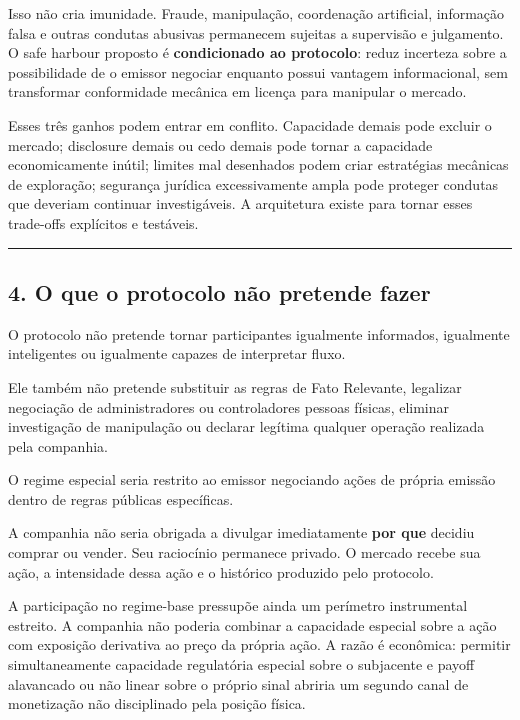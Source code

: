 \documentclass[
  a4paper,
]{article}
\begin{document}
Isso não cria imunidade. Fraude, manipulação, coordenação artificial,
informação falsa e outras condutas abusivas permanecem sujeitas a
supervisão e julgamento. O safe harbour proposto é \textbf{condicionado
ao protocolo}: reduz incerteza sobre a possibilidade de o emissor
negociar enquanto possui vantagem informacional, sem transformar
conformidade mecânica em licença para manipular o mercado.

Esses três ganhos podem entrar em conflito. Capacidade demais pode
excluir o mercado; disclosure demais ou cedo demais pode tornar a
capacidade economicamente inútil; limites mal desenhados podem criar
estratégias mecânicas de exploração; segurança jurídica excessivamente
ampla pode proteger condutas que deveriam continuar investigáveis. A
arquitetura existe para tornar esses trade-offs explícitos e testáveis.

\begin{center}\rule{0.5\linewidth}{0.5pt}\end{center}

\hypertarget{4-o-que-o-protocolo-nao-pretende-fazer}{}

\hypertarget{4-o-que-o-protocolo-nuxe3o-pretende-fazer}{%
\subsection{4. O que o protocolo não pretende
fazer}\label{4-o-que-o-protocolo-nuxe3o-pretende-fazer}}

O protocolo não pretende tornar participantes igualmente informados,
igualmente inteligentes ou igualmente capazes de interpretar fluxo.

Ele também não pretende substituir as regras de Fato Relevante,
legalizar negociação de administradores ou controladores pessoas
físicas, eliminar investigação de manipulação ou declarar legítima
qualquer operação realizada pela companhia.

O regime especial seria restrito ao emissor negociando ações de própria
emissão dentro de regras públicas específicas.

A companhia não seria obrigada a divulgar imediatamente \textbf{por que}
decidiu comprar ou vender. Seu raciocínio permanece privado. O mercado
recebe sua ação, a intensidade dessa ação e o histórico produzido pelo
protocolo.

A participação no regime-base pressupõe ainda um perímetro instrumental
estreito. A companhia não poderia combinar a capacidade especial sobre a
ação com exposição derivativa ao preço da própria ação. A razão é
econômica: permitir simultaneamente capacidade regulatória especial
sobre o subjacente e payoff alavancado ou não linear sobre o próprio
sinal abriria um segundo canal de monetização não disciplinado pela
posição física.
\end{document}
